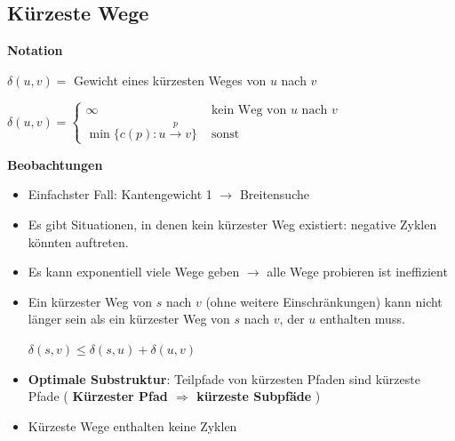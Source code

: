 \vspace{-4pt}
\begin{sectionbox}
\subsection{Kürzeste Wege}\smallskip
\textbf{Notation}\par\smallskip
$\delta(u, v)=$ Gewicht eines kürzesten Weges von $u$ nach $v$\par
$\delta(u, v)=\left\{\begin{array}{ll}
\infty & \text { kein Weg von } u \text { nach } v \\
\min \{c(p): u \stackrel{p}{\longrightarrow} v\} & \text { sonst }
\end{array}\right.$\par\smallskip

\textbf{Beobachtungen}\par
\begin{itemize}
    \item Einfachster Fall: Kantengewicht 1 $\rightarrow$ Breitensuche
    \item Es gibt Situationen, in denen kein kürzester Weg existiert: negative Zyklen könnten auftreten.
    \item Es kann exponentiell viele Wege geben $\rightarrow$  alle Wege probieren ist ineffizient
    \item Ein kürzester Weg von $s$ nach $v$ (ohne weitere Einschränkungen) kann nicht länger sein als ein kürzester Weg von $s$ nach $v$, der $u$ enthalten muss.\par
    \textcolor{tanne}{\textbf{$\delta(s, v) \leq \delta(s, u)+\delta(u, v)$}}
    \item \textbf{Optimale Substruktur}: Teilpfade von kürzesten Pfaden sind kürzeste Pfade ( \textbf{\textcolor{tanne}{Kürzester Pfad $\Rightarrow$ kürzeste Subpfäde}} )
    \item Kürzeste Wege enthalten keine Zyklen
\end{itemize}\par\vspace{10px}
\end{sectionbox}
\vspace{-4pt}

